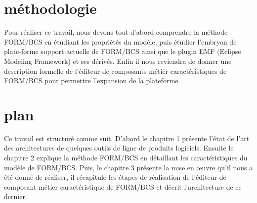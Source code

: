 \section*{méthodologie}
Pour réaliser ce travail, nous devons tout d'abord comprendre la méthode FORM/BCS en étudiant les propriétés du modèle, puis étudier l'embryon de plate-forme support actuelle de FORM/BCS ainsi que le plugin EMF (Eclipse Modeling Framework) et ses dérivés. Enfin il nous reviendra de donner une description formelle de l'éditeur de composants métier caractéristiques de FORM/BCS pour permettre l'expansion de la plateforme.

\section*{plan}
Ce travail est structuré comme suit. D'abord le chapitre 1 présente l'état de l'art des architectures de quelques outils de ligne de produits logiciels. Ensuite le chapitre 2 explique la méthode FORM/BCS en détaillant les caractéristiques du modèle de FORM/BCS. Puis, le chapitre 3 présente la mise en œuvre qu'il nous a été donné de réaliser, il récapitule les étapes de réalisation de l'éditeur de composant métier caractéristique de FORM/BCS et décrit l’architecture de ce dernier. 



